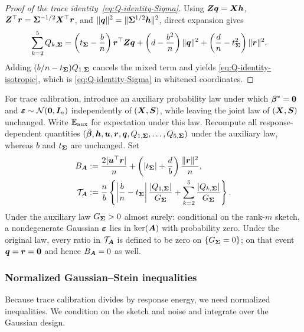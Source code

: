 \documentclass{article}
\theoremstyle{plain} %
\theoremstyle{definition} %
\theoremstyle{definition} %
\begin{document}
\begin{proof}[Proof of the trace identity~\eqref{eq:Q-identity-Sigma}]
Using $\boldsymbol{Z}\boldsymbol{q}=\boldsymbol{X}\boldsymbol{h}$,
$\boldsymbol{Z}^\top\boldsymbol{r}=\boldsymbol{\Sigma}^{-1/2}\boldsymbol{X}^\top\boldsymbol{r}$, and
$\lVert\boldsymbol{q}\rVert^2=\lVert\boldsymbol{\Sigma}^{1/2}\boldsymbol{h}\rVert^2$, direct expansion gives
\begin{align*}
    \sum_{k=2}^5Q_{k,\boldsymbol{\Sigma}}
    &=
    \left(t_{\boldsymbol{\Sigma}}-\frac bn\right)\boldsymbol{r}^\top\boldsymbol{Z}\boldsymbol{q}
    +\left(d-\frac{b^2}{n}\right)\lVert\boldsymbol{q}\rVert^2
    +\left(\frac dn-t_{\boldsymbol{\Sigma}}^2\right)\lVert\boldsymbol{r}\rVert^2.
\end{align*}
Adding $(b/n-t_{\boldsymbol{\Sigma}})Q_{1,\boldsymbol{\Sigma}}$ cancels the mixed term and yields
\eqref{eq:Q-identity-isotropic}, which is
\eqref{eq:Q-identity-Sigma} in whitened coordinates.
\end{proof}

For trace calibration, introduce an auxiliary probability law under which
$\boldsymbol{\beta}^*=\mathbf{0}$ and
${\boldsymbol{\varepsilon} }\sim{\mathcal N}(\mathbf{0},\boldsymbol{I}_n)$ independently of $(\boldsymbol{X},\boldsymbol{S})$, while leaving
the joint law of $(\boldsymbol{X},\boldsymbol{S})$ unchanged. Write ${\mathbb{E}}_{\rm aux}$ for expectation
under this law. Recompute all response-dependent quantities
$(\hat{\boldsymbol{\beta}}{},\boldsymbol{h},\boldsymbol{u},\boldsymbol{r},\boldsymbol{q},Q_{1,\boldsymbol{\Sigma}},\ldots,Q_{5,\boldsymbol{\Sigma}})$
under the auxiliary law, whereas $b$ and $t_{\boldsymbol{\Sigma}}$ are unchanged.  Set
\begin{align*}
    B_{\boldsymbol{A}}
    &:=\frac{2|\boldsymbol{u}^\top\boldsymbol{r}|}{n}
      +\left(|t_{\boldsymbol{\Sigma}}|+\frac{d}{b}\right)
       \frac{\lVert\boldsymbol{r}\rVert^2}{n},\\
    \mathcal T_{\boldsymbol{A}}
    &:=\frac{n}{b}\left\{
       \left|\frac{b}{n}-t_{\boldsymbol{\Sigma}}\right|
       \frac{|Q_{1,\boldsymbol{\Sigma}}|}{G_{\boldsymbol{\Sigma}}}
       +\sum_{k=2}^5\frac{|Q_{k,\boldsymbol{\Sigma}}|}{G_{\boldsymbol{\Sigma}}}
      \right\}.
\end{align*}
Under the auxiliary law $G_{\boldsymbol{\Sigma}}>0$ almost surely: conditional on
the rank-$m$ sketch, a nondegenerate Gaussian ${\boldsymbol{\varepsilon} }$ lies in
$\ker(\boldsymbol{A})$ with probability zero. Under the original
law, every ratio in $\mathcal T_{\boldsymbol{A}}$ is defined to be zero on
$\{G_{\boldsymbol{\Sigma}}=0\}$; on that event $\boldsymbol{q}=\boldsymbol{r}=\mathbf{0}$ and hence
$B_{\boldsymbol{A}}=0$ as well.

\subsubsection{Normalized Gaussian--Stein inequalities}

Because trace calibration divides by response energy, we need normalized
inequalities. We condition on the sketch and noise and integrate over the
Gaussian design.
\end{document}
